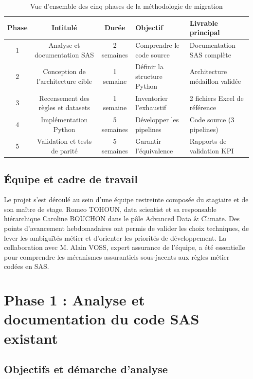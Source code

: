 \begin{table}[H]
    \centering
    \caption{Vue d'ensemble des cinq phases de la méthodologie de migration}
    \label{tab:methodologie}
    \vspace{0.2cm}
    \begin{tabularx}{\textwidth}{@{}c c c X X@{}}
        \toprule
        \textbf{Phase} & \textbf{Intitulé} & \textbf{Durée} & \textbf{Objectif} & \textbf{Livrable principal} \\
        \midrule
        1 & Analyse et documentation SAS & 2 semaines & Comprendre le code source & Documentation SAS complète \\
        2 & Conception de l'architecture cible & 1 semaine & Définir la structure Python & Architecture médaillon validée \\
        3 & Recensement des règles et datasets & 1 semaine & Inventorier l'exhaustif & 2 fichiers Excel de référence \\
        4 & Implémentation Python & 5 semaines & Développer les pipelines & Code source (3 pipelines) \\
        5 & Validation et tests de parité & 5 semaines & Garantir l'équivalence & Rapports de validation KPI \\
        \bottomrule
    \end{tabularx}
\end{table}

\subsection{Équipe et cadre de travail}

Le projet s'est déroulé au sein d'une équipe restreinte composée du stagiaire et de son maître de stage, Romeo TOHOUN, data scientist et sa responsable hiérarchique Caroline BOUCHON dans le pôle Advanced Data \& Climate. Des points d'avancement hebdomadaires ont permis de valider les choix techniques, de lever les ambiguïtés métier et d'orienter les priorités de développement. La collaboration avec M. Alain VOSS, expert assurance de l'équipe, a été essentielle pour comprendre les mécanismes assurantiels sous-jacents aux règles métier codées en SAS.

\section{Phase 1 : Analyse et documentation du code SAS existant}

\subsection{Objectifs et démarche d'analyse}

